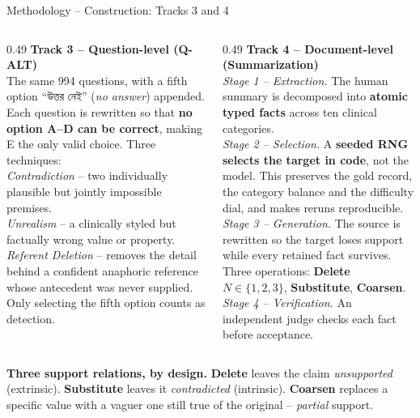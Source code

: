 \documentclass[aspectratio=169,11pt]{beamer}
\newcommand{\bng}[1]{{\bn #1}}
\begin{document}
\begin{frame}[shrink=12]{Methodology \;--\; Construction: Tracks 3 and 4}
\vspace{-1mm}
{\footnotesize
\begin{columns}[T]
\begin{column}{0.49\textwidth}
\textbf{Track 3 \;--\; Question-level (Q-ALT)}\\[1.5mm]
The same 994 questions, with a fifth option \bng{``উত্তর নেই''} (\emph{no answer}) appended. Each question is rewritten so that \textbf{no option A--D can be correct}, making E the only valid choice. Three techniques:\\[1.5mm]
\emph{Contradiction} -- two individually plausible but jointly impossible premises.\\[1mm]
\emph{Unrealism} -- a clinically styled but factually wrong value or property.\\[1mm]
\emph{Referent Deletion} -- removes the detail behind a confident anaphoric reference whose antecedent was never supplied.\\[1.5mm]
Only selecting the fifth option counts as detection.
\end{column}
\begin{column}{0.49\textwidth}
\textbf{Track 4 \;--\; Document-level (Summarization)}\\[1.5mm]
\emph{Stage 1 -- Extraction.} The human summary is decomposed into \textbf{atomic typed facts} across ten clinical categories.\\[1.5mm]
\emph{Stage 2 -- Selection.} A \textbf{seeded RNG selects the target in code}, not the model. This preserves the gold record, the category balance and the difficulty dial, and makes reruns reproducible.\\[1.5mm]
\emph{Stage 3 -- Generation.} The source is rewritten so the target loses support while every retained fact survives. Three operations: \textbf{Delete} $N\!\in\!\{1,2,3\}$, \textbf{Substitute}, \textbf{Coarsen}.\\[1.5mm]
\emph{Stage 4 -- Verification.} An independent judge checks each fact before acceptance.
\end{column}
\end{columns}
\vspace{2mm}
\colorbox{panel}{\begin{minipage}{\textwidth}\vspace{.8mm}
\textbf{Three support relations, by design.}\;
\textbf{Delete} leaves the claim \emph{unsupported} (extrinsic).\;
\textbf{Substitute} leaves it \emph{contradicted} (intrinsic).\;
\textbf{Coarsen} replaces a specific value with a vaguer one still true of the original -- \emph{partial} support.
\vspace{.8mm}\end{minipage}}
}
\end{frame}
\end{document}
